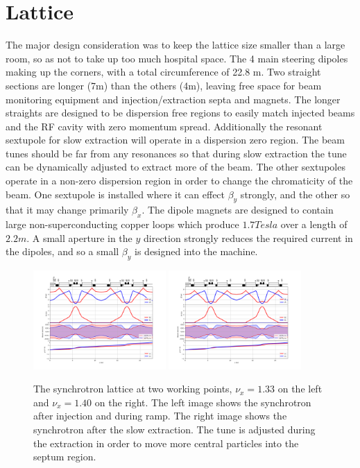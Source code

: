 \section{Lattice}
The major design consideration was to keep the lattice size smaller than a large room, so as not to take up too much hospital space.  
The 4 main steering dipoles making up the
corners, with a total circumference of 22.8 m.  Two straight sections are longer (7m) than the others (4m), leaving free space for beam 
monitoring equipment and injection/extraction septa and magnets.  The longer straights are designed to be dispersion free regions to easily match injected beams
and the RF cavity with zero momentum spread.  Additionally the resonant sextupole for slow extraction will operate in a dispersion zero region.
The beam tunes should be far from any resonances so that during slow extraction the tune can be dynamically adjusted to extract more of the beam.
The other sextupoles operate in a non-zero dispersion region in order to change the chromaticity of the beam.  One sextupole is installed where it can effect
$\beta_y$ strongly, and the other so that it may change primarily $\beta_x$.  The dipole magnets are designed to contain large non-superconducting copper loops
which produce $1.7 Tesla$ over a length of $2.2 m$. A small aperture in the $y$ direction strongly reduces the required current in the dipoles, and so a small 
$\beta_y$ is designed into the machine.  
\begin{figure}[h] 
  \begin{center}
    \includegraphics[width=0.45\textwidth]{twiss_33.png}
    \includegraphics[width=0.45\textwidth]{twiss_40.png}
    \caption{The synchrotron lattice at two working points, $\nu_x = 1.33$ on the left and $\nu_x = 1.40$ on the right. 
      The left image shows the synchrotron after injection and during ramp.  The right
      image shows the synchrotron after the slow extraction.  The tune is adjusted during the extraction in order to move more central particles into
    the septum region. }

  \end{center}
  \label{fig:lat}
\end{figure}

